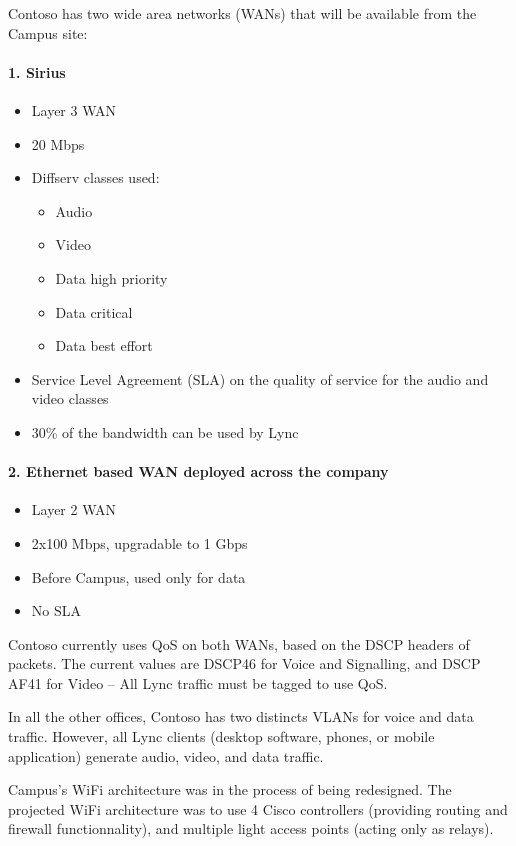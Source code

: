 	Contoso has two wide area networks (WANs) that will be available from the Campus site:
	\paragraph{1. Sirius}
		\begin{itemize}
			\item Layer 3 WAN
			\item 20 Mbps
			\item Diffserv classes used: 
				\begin{itemize}
					\item Audio
					\item Video
					\item Data high priority
					\item Data critical
					\item Data best effort
				\end{itemize}
			\item Service Level Agreement (SLA) on the quality of service for the audio and video classes
			\item 30\% of the bandwidth can be used by Lync
		\end{itemize}

	\paragraph{2. Ethernet based WAN deployed across the company}
		\begin{itemize}
			\item Layer 2 WAN
			\item 2x100 Mbps, upgradable to 1 Gbps
			\item Before Campus, used only for data
			\item No SLA
		\end{itemize}
			
	
	Contoso currently uses QoS on both WANs, based on the DSCP headers of packets. The current values are DSCP46 for Voice and Signalling, and DSCP AF41 for Video -- 
	All Lync traffic must be tagged to use QoS.
	
	In all the other offices, Contoso has two distincts VLANs for voice and data traffic. However, all Lync clients (desktop software, phones, or mobile application) generate audio, video, and data traffic.
	
	Campus's WiFi architecture was in the process of being redesigned. The projected WiFi architecture was to use 4 Cisco controllers (providing routing and firewall functionnality), and multiple light access points (acting only as relays).

